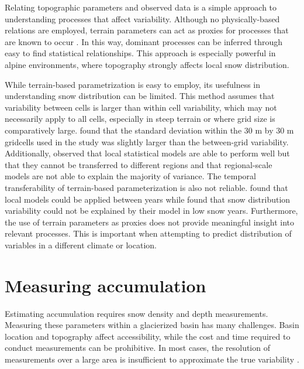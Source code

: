 \documentclass{sfuthesis}
\begin{document}
Relating topographic parameters and observed data is a simple approach to understanding processes that affect variability. Although no physically-based relations are employed, terrain parameters can act as proxies for processes that are known to occur \citep{McGrath2015}. In this way, dominant processes can be inferred through easy to find statistical relationships. This approach is especially powerful in alpine environments, where topography strongly affects local snow distribution. 

While terrain-based parametrization is easy to employ, its usefulness in understanding snow distribution can be limited. This method assumes that variability between cells is larger than within cell variability, which may not necessarily apply to all cells, especially in steep terrain or where grid size is comparatively large. \cite{Marchand2005} found that the standard deviation within the 30 m by 30 m gridcells used in the study was slightly larger than the between-grid variability. Additionally, \cite{Grunewald2013} observed that local statistical models are able to perform well but that they cannot be transferred to different regions and that regional-scale models are not able to explain the majority of variance. The temporal transferability of terrain-based parameterization is also not reliable. \cite{Grunewald2013} found that local models could be applied between years while \cite{Revuelto2014} found that snow distribution variability could not be explained by their model in low snow years. Furthermore, the use of terrain parameters as proxies does not provide meaningful insight into relevant processes. This is important when attempting to predict distribution of variables in a different climate or location. 


\section{Measuring accumulation}
Estimating accumulation requires snow density and depth measurements. Measuring these parameters within a glacierized basin has many challenges. Basin location and topography affect accessibility, while the cost and time required to conduct measurements can be prohibitive. In most cases, the resolution of measurements over a large area is insufficient to approximate the true variability \citep{Bloeschl1999, Deems2006a}.
\end{document}
